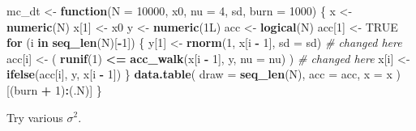 \documentclass[]{book}
\newenvironment{Shaded}{\begin{snugshade}}{\end{snugshade}}
\newcommand{\CommentTok}[1]{\textcolor[rgb]{0.56,0.35,0.01}{\textit{#1}}}
\newcommand{\ControlFlowTok}[1]{\textcolor[rgb]{0.13,0.29,0.53}{\textbf{#1}}}
\newcommand{\DataTypeTok}[1]{\textcolor[rgb]{0.13,0.29,0.53}{#1}}
\newcommand{\DecValTok}[1]{\textcolor[rgb]{0.00,0.00,0.81}{#1}}
\newcommand{\ErrorTok}[1]{\textcolor[rgb]{0.64,0.00,0.00}{\textbf{#1}}}
\newcommand{\FloatTok}[1]{\textcolor[rgb]{0.00,0.00,0.81}{#1}}
\newcommand{\KeywordTok}[1]{\textcolor[rgb]{0.13,0.29,0.53}{\textbf{#1}}}
\newcommand{\NormalTok}[1]{#1}
\newcommand{\OperatorTok}[1]{\textcolor[rgb]{0.81,0.36,0.00}{\textbf{#1}}}
\newcommand{\OtherTok}[1]{\textcolor[rgb]{0.56,0.35,0.01}{#1}}
\newcommand{\StringTok}[1]{\textcolor[rgb]{0.31,0.60,0.02}{#1}}
\theoremstyle{definition}
\theoremstyle{definition}
\theoremstyle{definition}
\theoremstyle{remark}
\begin{document}
\begin{Shaded}
\begin{Highlighting}[]
\NormalTok{mc_dt <-}\StringTok{ }\ControlFlowTok{function}\NormalTok{(}\DataTypeTok{N =} \DecValTok{10000}\NormalTok{, x0, }\DataTypeTok{nu =} \DecValTok{4}\NormalTok{, sd, }\DataTypeTok{burn =} \DecValTok{1000}\NormalTok{) \{}
\NormalTok{  x <-}\StringTok{ }\KeywordTok{numeric}\NormalTok{(N)}
\NormalTok{  x[}\DecValTok{1}\NormalTok{] <-}\StringTok{ }\NormalTok{x0}
\NormalTok{  y <-}\StringTok{ }\KeywordTok{numeric}\NormalTok{(1L)}
\NormalTok{  acc <-}\StringTok{ }\KeywordTok{logical}\NormalTok{(N)}
\NormalTok{  acc[}\DecValTok{1}\NormalTok{] <-}\StringTok{ }\OtherTok{TRUE}
  \ControlFlowTok{for}\NormalTok{ (i }\ControlFlowTok{in} \KeywordTok{seq_len}\NormalTok{(N)[}\OperatorTok{-}\DecValTok{1}\NormalTok{]) \{}
\NormalTok{    y[}\DecValTok{1}\NormalTok{] <-}\StringTok{ }\KeywordTok{rnorm}\NormalTok{(}\DecValTok{1}\NormalTok{, x[i }\OperatorTok{-}\StringTok{ }\DecValTok{1}\NormalTok{], }\DataTypeTok{sd =}\NormalTok{ sd) }\CommentTok{# changed here}
\NormalTok{    acc[i] <-}\StringTok{ }\NormalTok{( }\KeywordTok{runif}\NormalTok{(}\DecValTok{1}\NormalTok{) }\OperatorTok{<=}\StringTok{ }\KeywordTok{acc_walk}\NormalTok{(x[i }\OperatorTok{-}\StringTok{ }\DecValTok{1}\NormalTok{], y, }\DataTypeTok{nu =}\NormalTok{ nu) ) }\CommentTok{# changed here}
\NormalTok{    x[i] <-}\StringTok{ }\KeywordTok{ifelse}\NormalTok{(acc[i], y, x[i }\OperatorTok{-}\StringTok{ }\DecValTok{1}\NormalTok{])}
\NormalTok{  \}}
  \KeywordTok{data.table}\NormalTok{(}
    \DataTypeTok{draw =} \KeywordTok{seq_len}\NormalTok{(N),}
    \DataTypeTok{acc =}\NormalTok{ acc,}
    \DataTypeTok{x =}\NormalTok{ x}
\NormalTok{  )[(burn }\OperatorTok{+}\StringTok{ }\DecValTok{1}\NormalTok{)}\OperatorTok{:}\NormalTok{(.N)]}
\NormalTok{\}}
\end{Highlighting}
\end{Shaded}

Try various \(\sigma^2\).

\begin{Shaded}
\end{Shaded}
\end{document}
